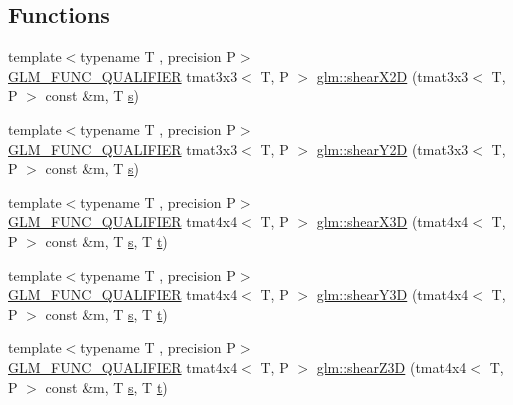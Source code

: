 \subsection*{Functions}
\begin{DoxyCompactItemize}
\item 
{\footnotesize template$<$typename T , precision P$>$ }\\\mbox{\hyperlink{setup_8hpp_a33fdea6f91c5f834105f7415e2a64407}{G\+L\+M\+\_\+\+F\+U\+N\+C\+\_\+\+Q\+U\+A\+L\+I\+F\+I\+ER}} tmat3x3$<$ T, P $>$ \mbox{\hyperlink{group__gtx__transform2_ga10f6c62d8f827c4cacedb71fd05e4ba2}{glm\+::shear\+X2D}} (tmat3x3$<$ T, P $>$ const \&m, T \mbox{\hyperlink{glad_8h_af1b1d5edfea6a34daee7389b1b5810ad}{s}})
\item 
{\footnotesize template$<$typename T , precision P$>$ }\\\mbox{\hyperlink{setup_8hpp_a33fdea6f91c5f834105f7415e2a64407}{G\+L\+M\+\_\+\+F\+U\+N\+C\+\_\+\+Q\+U\+A\+L\+I\+F\+I\+ER}} tmat3x3$<$ T, P $>$ \mbox{\hyperlink{group__gtx__transform2_ga21ade82859e09a5cdaf4a01fbf8dc61b}{glm\+::shear\+Y2D}} (tmat3x3$<$ T, P $>$ const \&m, T \mbox{\hyperlink{glad_8h_af1b1d5edfea6a34daee7389b1b5810ad}{s}})
\item 
{\footnotesize template$<$typename T , precision P$>$ }\\\mbox{\hyperlink{setup_8hpp_a33fdea6f91c5f834105f7415e2a64407}{G\+L\+M\+\_\+\+F\+U\+N\+C\+\_\+\+Q\+U\+A\+L\+I\+F\+I\+ER}} tmat4x4$<$ T, P $>$ \mbox{\hyperlink{group__gtx__transform2_gae06ce274e4754f925d5d68440e89452e}{glm\+::shear\+X3D}} (tmat4x4$<$ T, P $>$ const \&m, T \mbox{\hyperlink{glad_8h_af1b1d5edfea6a34daee7389b1b5810ad}{s}}, T \mbox{\hyperlink{glad_8h_aef9f00bf06d58b8db7e501e287488401}{t}})
\item 
{\footnotesize template$<$typename T , precision P$>$ }\\\mbox{\hyperlink{setup_8hpp_a33fdea6f91c5f834105f7415e2a64407}{G\+L\+M\+\_\+\+F\+U\+N\+C\+\_\+\+Q\+U\+A\+L\+I\+F\+I\+ER}} tmat4x4$<$ T, P $>$ \mbox{\hyperlink{group__gtx__transform2_ga31253ea18fdcdfde08c134c8b67688f7}{glm\+::shear\+Y3D}} (tmat4x4$<$ T, P $>$ const \&m, T \mbox{\hyperlink{glad_8h_af1b1d5edfea6a34daee7389b1b5810ad}{s}}, T \mbox{\hyperlink{glad_8h_aef9f00bf06d58b8db7e501e287488401}{t}})
\item 
{\footnotesize template$<$typename T , precision P$>$ }\\\mbox{\hyperlink{setup_8hpp_a33fdea6f91c5f834105f7415e2a64407}{G\+L\+M\+\_\+\+F\+U\+N\+C\+\_\+\+Q\+U\+A\+L\+I\+F\+I\+ER}} tmat4x4$<$ T, P $>$ \mbox{\hyperlink{group__gtx__transform2_ga5558ac64a7144685bf2eb4483a0e2f51}{glm\+::shear\+Z3D}} (tmat4x4$<$ T, P $>$ const \&m, T \mbox{\hyperlink{glad_8h_af1b1d5edfea6a34daee7389b1b5810ad}{s}}, T \mbox{\hyperlink{glad_8h_aef9f00bf06d58b8db7e501e287488401}{t}})

\end{DoxyCompactItemize}
